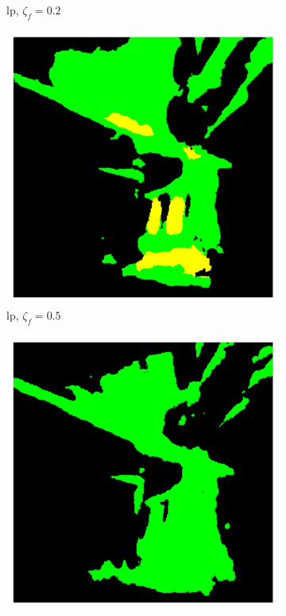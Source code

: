 \documentclass[mathematics,article,submit,pdftex,moreauthors]{Definitions/mdpi}
\begin{document}
\begin{figure}[!ht]
\begin{subfigure}[t]{.29\textwidth}
      \caption{\ac{lp}, $\zeta_f=0.2$}
      \label{fig:results:pruning:visualization:ccsc-linknet-lp-0.2}
    \end{subfigure}
    \begin{subfigure}[t]{.29\textwidth} 
      \centering
      \includegraphics[width=.95\linewidth]{figures/pruning-results/linknet_CCSC_linear/0/mask_0.5.jpg}
      \caption{\ac{lp}, $\zeta_f=0.5$}
      \label{fig:results:pruning:visualization:ccsc-linknet-lp-0.5}
    \end{subfigure}
    \begin{subfigure}[t]{.29\textwidth} 
      \centering
      \includegraphics[width=.95\linewidth]{figures/pruning-results/linknet_CCSC_linear/0/mask_0.9.jpg}

\end{subfigure}
\end{figure}
\end{document}
